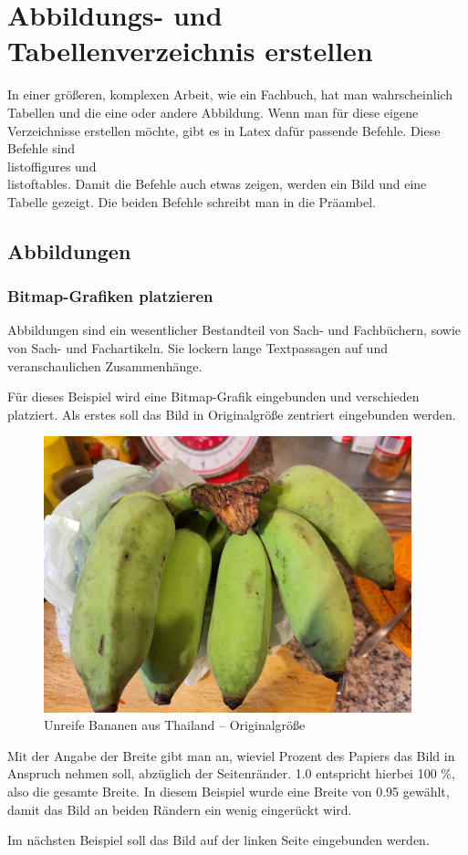 \section{Abbildungs- und Tabellenverzeichnis erstellen}

In einer größeren, komplexen Arbeit, wie ein Fachbuch, hat man wahrscheinlich Tabellen und die eine oder andere Abbildung. Wenn man für diese eigene Verzeichnisse erstellen möchte, gibt es in Latex dafür passende Befehle. Diese Befehle sind \\listoffigures und \\listoftables. Damit die Befehle auch etwas zeigen, werden ein Bild und eine Tabelle gezeigt. Die beiden Befehle schreibt man in die Präambel.

\subsection{Abbildungen}

\subsubsection{Bitmap-Grafiken platzieren}

Abbildungen sind ein wesentlicher Bestandteil von Sach- und Fachbüchern, sowie von Sach- und Fachartikeln. Sie lockern lange Textpassagen auf und veranschaulichen Zusammenhänge.

Für dieses Beispiel wird eine Bitmap-Grafik eingebunden und verschieden platziert. Als erstes soll das Bild in Originalgröße zentriert eingebunden werden.

\begin{figure}[H]
	\centering
	\includegraphics[width=0.95\textwidth]{../images/ThaiBananen}
	\caption{Unreife Bananen aus Thailand -- Originalgröße}
	\label{fig:thai-bananen}
	\end{figure}
	
Mit der Angabe der Breite gibt man an, wieviel Prozent des Papiers das Bild in Anspruch nehmen soll, abzüglich der Seitenränder. 1.0 entspricht hierbei 100 \%, also die gesamte Breite. In diesem Beispiel wurde eine Breite von 0.95 gewählt, damit das Bild an beiden Rändern ein wenig eingerückt wird.

Im nächsten Beispiel soll das Bild auf der linken Seite eingebunden werden.


		
